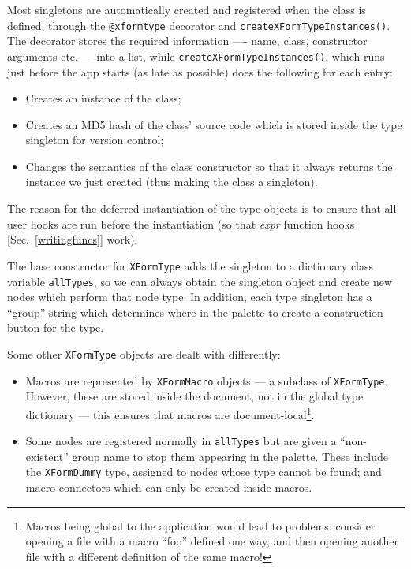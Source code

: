 Most singletons are automatically created and registered when the class
is defined, through the \texttt{@xformtype} decorator and \texttt{createXFormTypeInstances()}. 
The decorator stores the required information ---- name, class, constructor arguments etc. ---
into a list, while \texttt{createXFormTypeInstances()}, which runs just before the app starts (as
late as possible) does the following for each entry:
\begin{itemize}
\item Creates an instance of the class;
\item Creates an MD5 hash of the class' source code which is stored
inside the type singleton for version control;
\item Changes the semantics of the class constructor so that
it always returns the instance we just created (thus making the class
a singleton).
\end{itemize}
The reason for the deferred instantiation of the type objects is to ensure that all user
hooks are run before the instantiation (so that \emph{expr} function hooks [Sec.~\ref{writingfuncs}]
work).

The base constructor for \texttt{XFormType} adds the singleton
to a dictionary class variable \texttt{allTypes}, so we can always
obtain the singleton object and create new nodes which perform that
node type. In addition, each type singleton has a ``group'' string which 
determines where in the palette to create a construction button for the type.

Some other \texttt{XFormType} objects are dealt with differently:
\begin{itemize}
\item Macros are represented by \texttt{XFormMacro} objects --- a subclass
of \texttt{XFormType}. However, these
are stored inside the document, not in the global type
dictionary --- this ensures that macros are document-local\footnote{Macros
being global to the application would lead to problems:
consider opening a file with a macro ``foo'' defined one way, and then
opening another file with a different definition of the same macro!}.
\item Some nodes are registered normally in \texttt{allTypes} but are given
a ``non-existent'' group name to stop them appearing in the palette.
These include the \texttt{XFormDummy} type, assigned to nodes whose
type cannot be found; and macro connectors which can only be created inside
macros.
\end{itemize}

